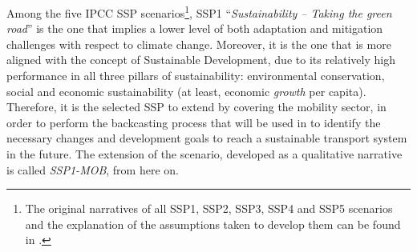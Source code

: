 Among the five IPCC \gls{SSP} scenarios\footnote{The original narratives of all SSP1, SSP2, SSP3, SSP4 and SSP5 scenarios and the explanation of the assumptions taken to develop them can be found in \textcite{oneill2017_roadsaheadNarratives}.}, SSP1 ``\textit{Sustainability -- Taking the green road}'' is the one that implies a lower level of both adaptation and mitigation challenges with respect to climate change. Moreover, it is the one that is more aligned with the concept of Sustainable Development, due to its relatively high performance in all three pillars of sustainability: environmental conservation, social and economic sustainability (at least, economic \emph{growth} per capita). Therefore, it is the selected SSP to extend by covering the mobility sector, in order to perform the backcasting process that will be used in  to identify the necessary changes and development goals to reach a sustainable transport system in the future. The extension of the scenario, developed as a qualitative narrative is called \emph{SSP1-MOB}, from here on.

